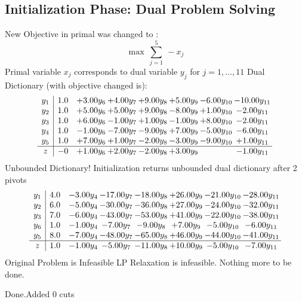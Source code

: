 \documentclass[8pt]{article}
\begin{document}
\subsection{Initialization Phase: Dual Problem Solving}
New Objective in primal was changed to : \[ \max\ \sum_{j=1}^{5}\ - x_j \] 
Primal variable $x_j$ corresponds to dual variable $y_j$ for $j = 1,\ldots,11$
Dual Dictionary (with objective changed is): 
\[\begin{array}{c| c c@{\hskip 2pt} c@{\hskip 2pt} c@{\hskip 2pt} c@{\hskip 2pt} c@{\hskip 2pt} c@{\hskip 2pt} }
 y_{1}   &  1.0 & +  3.00 y_{6} & +  4.00 y_{7} & +  9.00 y_{8} & +  5.00 y_{9} & -6.00 y_{10} & -10.00 y_{11}\\
 y_{2}   &  1.0 & +  5.00 y_{6} & +  5.00 y_{7} & +  9.00 y_{8} & -8.00 y_{9} & +  1.00 y_{10} & -2.00 y_{11}\\
 y_{3}   &  1.0 & +  6.00 y_{6} & -1.00 y_{7} & +  1.00 y_{8} & -1.00 y_{9} & +  8.00 y_{10} & -2.00 y_{11}\\
 y_{4}   &  1.0 & -1.00 y_{6} & -7.00 y_{7} & -9.00 y_{8} & +  7.00 y_{9} & -5.00 y_{10} & -6.00 y_{11}\\
 y_{5}   &  1.0 & +  7.00 y_{6} & +  1.00 y_{7} & -2.00 y_{8} & -3.00 y_{9} & -9.00 y_{10} & +  1.00 y_{11}\\
\hline
z    &  -0 & +  1.00 y_{6} & +  2.00 y_{7} & -2.00 y_{8} & +  3.00 y_{9} &   & -1.00 y_{11}\\
\end{array}\]
Unbounded Dictionary!
Initialization returns unbounded dual dictionary after 2 pivots
\[\begin{array}{c| c c@{\hskip 2pt} c@{\hskip 2pt} c@{\hskip 2pt} c@{\hskip 2pt} c@{\hskip 2pt} c@{\hskip 2pt} }
 y_{1}   &  4.0 & -3.00 y_{4} & -17.00 y_{7} & -18.00 y_{8} & + 26.00 y_{9} & -21.00 y_{10} & -28.00 y_{11}\\
 y_{2}   &  6.0 & -5.00 y_{4} & -30.00 y_{7} & -36.00 y_{8} & + 27.00 y_{9} & -24.00 y_{10} & -32.00 y_{11}\\
 y_{3}   &  7.0 & -6.00 y_{4} & -43.00 y_{7} & -53.00 y_{8} & + 41.00 y_{9} & -22.00 y_{10} & -38.00 y_{11}\\
 y_{6}   &  1.0 & -1.00 y_{4} & -7.00 y_{7} & -9.00 y_{8} & +  7.00 y_{9} & -5.00 y_{10} & -6.00 y_{11}\\
 y_{5}   &  8.0 & -7.00 y_{4} & -48.00 y_{7} & -65.00 y_{8} & + 46.00 y_{9} & -44.00 y_{10} & -41.00 y_{11}\\
\hline
z    &  1.0 & -1.00 y_{4} & -5.00 y_{7} & -11.00 y_{8} & + 10.00 y_{9} & -5.00 y_{10} & -7.00 y_{11}\\
\end{array}\]
Original Problem is Infeasible
 LP Relaxation is infeasible. Nothing more to be done. 

Done.Added 0 cuts 
\end{document}
